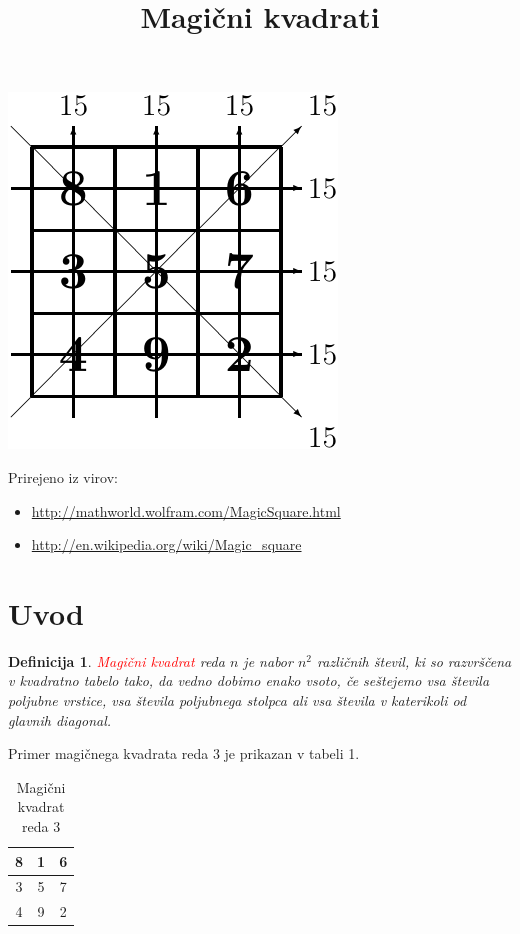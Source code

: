 \documentclass[a4paper,12pt]{article}
\newtheorem{definicija}[izrek]{Definicija}
\begin{document}
\title{Magični kvadrati}
\date{}
\maketitle
\begin{center}
\includegraphics{slika.pdf}
\end{center}

Prirejeno iz virov:

\begin{itemize}
   \item \url{http://mathworld.wolfram.com/MagicSquare.html}
   \item \url{http://en.wikipedia.org/wiki/Magic_square}
\end{itemize}

\tableofcontents

\newpage

\section{Uvod}

\begin{definicija}
   \textcolor{red}{\emph{Magični kvadrat}} reda $n$ je nabor $n^2$ različnih števil,
   ki so razvrščena v kvadratno tabelo tako, da vedno dobimo enako vsoto,
   če seštejemo vsa števila poljubne vrstice, vsa števila poljubnega
   stolpca ali vsa števila v katerikoli od glavnih diagonal.
\end{definicija}

Primer magičnega kvadrata reda 3 je prikazan v tabeli 1.

\begin{table}[h]
   \centering
   \large
   \caption{Magični kvadrat reda 3}
   \begin{tabular}{|c|c|c|}
      \hline
         8 & 1 & 6 \\\hline
         3 & 5 & 7 \\\hline
         4 & 9 & 2 \\\hline
   \end{tabular}
   \label{table:mag3}
\end{table}
\end{document}
